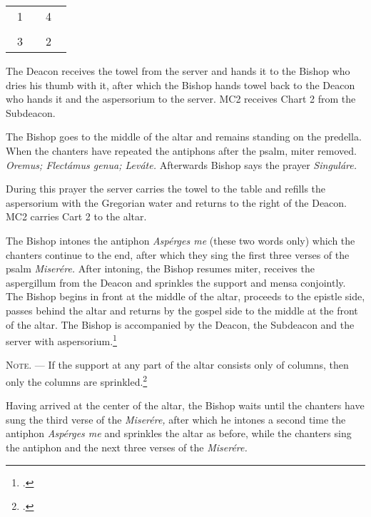 \documentclass[letterpaper]{report}
\newcommand\crossplan{
\begin{center}
    \begin{tabular}{ | l c r | }
       \hline
        \cross\ {\tiny 1} &         & {\tiny 4} \cross\ \\
                           & \cross &           \\
        \cross\ {\tiny 3} &         & {\tiny 2} \cross\ \\
       \hline
   \end{tabular} 
\end{center}
}
\begin{document}
{    \crossplan

    The Deacon receives the towel from the server and hands it to the Bishop who
    dries his thumb with it, after which the Bishop hands towel back to the Deacon
    who hands it and the aspersorium to the server. MC2 receives Chart 2 from
    the Subdeacon.

    \rubric The Bishop goes to the middle of the altar and remains standing on the
    predella. When the chanters have repeated the antiphons after the psalm, miter
    removed. \textit{Oremus; Flectámus genua; Leváte.} Afterwards Bishop says the
    prayer \textit{Singuláre.}

    During this prayer the server carries the towel to the table and refills the
    aspersorium with the Gregorian water and returns to the right of the Deacon.
    MC2 carries Cart 2 to the altar.

    \rubric The Bishop intones the antiphon \textit{Asp\'erges me} (these two
    words only) which the chanters continue to the end, after which they sing
    the first three verses of the psalm \textit{Miser\'ere.} After intoning,
    the Bishop resumes miter, receives the aspergillum from the Deacon and
    sprinkles the support and mensa conjointly. The Bishop begins in front at
    the middle of the altar, proceeds to the epistle side, passes behind the
    altar and returns by the gospel side to the middle at the front of the
    altar. The Bishop is accompanied by the Deacon, the Subdeacon and the
    server with aspersorium.\footcite[If the back part of the altar is attached
    to the wall, so that the Bishop cannot go around it, he sprinkles only the
    \textit{base} of the altar when passing from the middle to the epistle
    corner, then the epistle side of the altar, afterwards the table of the
    altar from the epistle corner to the gospel corner, then the gospel side of
    the altar and finally the \textit{base} in front of the altar from the
    gospel corner to the middle.][footnote, p. 68.]{consecranda}

    \textsc{Note. ---} If the support at any part of the altar consists only of
    columns, then only the columns are sprinkled.\footcite[][p. 68.]{consecranda}

    \rubric Having arrived at the center of the altar, the Bishop waits until
    the chanters have sung the third verse of the \textit{Miser\'ere,} after
    which he intones a second time the antiphon \textit{Asp\'erges me} and
    sprinkles the altar as before, while the chanters sing the antiphon and the
    next three verses of the \textit{Miser\'ere.}

}
\end{document}

